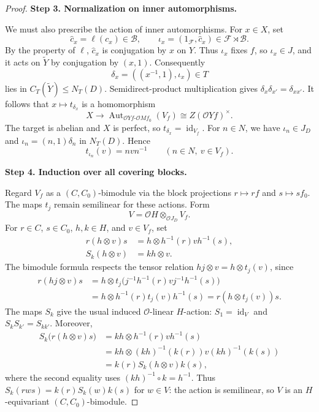 \documentclass[11pt,a4paper]{article}
\theoremstyle{definition}
\theoremstyle{remark}
\numberwithin{equation}{section}
\newcommand{\cO}{\mathcal{O}}
\DeclareMathOperator{\Aut}{Aut}
\DeclareMathOperator{\id}{id}
\newcommand{\proofstep}[1]{%
	\par\addvspace{\medskipamount}%
	\noindent\textbf{#1}\par\nobreak
	\smallskip\nobreak\noindent\ignorespaces
}
\begin{document}
\begin{proof}
		\proofstep{Step 3. Normalization on inner automorphisms.}
		We must also prescribe the action of inner automorphisms.
		For $x\in X$, set
		\[
		\widehat c_x=\ell(c_x)\in\mathcal B,\qquad
		\iota_x=(1_{\mathcal F},\widehat c_x)\in\mathcal F\rtimes\mathcal B.
		\]
		By the property of $\ell$, $\widehat c_x$ is conjugation by $x$
		on $Y$. Thus $\iota_x$ fixes $f$, so $\iota_x\in J$, and it acts
		on $\widetilde Y$ by conjugation by $(x,1)$.
		Consequently
		\[
		\delta_x=((x^{-1},1),\iota_x)\in T
		\]
		lies in $C_T(\widetilde Y)\leq N_T(D)$.
		Semidirect-product multiplication gives
		$\delta_x\delta_{x'}=\delta_{xx'}$.
		It follows that $x\mapsto t_{\delta_x}$ is a homomorphism
		\[
		X\longrightarrow
		\Aut_{\cO Yf\text{-}\cO Mf_0}(V_f)
		\cong Z(\cO Yf)^\times.
		\]
		The target is abelian and $X$ is perfect, so $t_{\delta_x}=\id_{V_f}$.
		For $n\in N$, we have $\iota_n\in J_D$ and
		$\iota_n=(n,1)\delta_n$ in $N_T(D)$. Hence
		\begin{equation}\label{eq:local-cover-inner}
			t_{\iota_n}(v)=nvn^{-1}\qquad(n\in N,\ v\in V_f).
		\end{equation}
		\proofstep{Step 4. Induction over all covering blocks.}
		Regard $V_f$ as a $(C,C_0)$-bimodule via the block projections
		$r\mapsto rf$ and $s\mapsto sf_0$.
		The maps $t_j$ remain semilinear for these actions.
		Form
		\[
		V=\cO H\otimes_{\cO J_D}V_f.
		\]
		For $r\in C$, $s\in C_0$, $h,k\in H$, and $v\in V_f$, set
		\[
		\begin{aligned}
			r(h\otimes v)s&=h\otimes h^{-1}(r)v h^{-1}(s),\\
			S_k(h\otimes v)&=kh\otimes v.
		\end{aligned}
		\]
		The bimodule formula respects the tensor relation
		$hj\otimes v=h\otimes t_j(v)$, since
		\[
		\begin{aligned}
			r(hj\otimes v)s
			&=h\otimes t_j\bigl(j^{-1}h^{-1}(r)v j^{-1}h^{-1}(s)\bigr)\\
			&=h\otimes h^{-1}(r)t_j(v)h^{-1}(s)
			=r(h\otimes t_j(v))s.
		\end{aligned}
		\]
		The maps $S_k$ give the usual induced $\cO$-linear $H$-action:
		$S_1=\id_V$ and $S_kS_{k'}=S_{kk'}$.
		Moreover,
		\[
		\begin{aligned}
			S_k\bigl(r(h\otimes v)s\bigr)
			&=kh\otimes h^{-1}(r)v h^{-1}(s)\\
			&=kh\otimes (kh)^{-1}(k(r))v (kh)^{-1}(k(s))\\
			&=k(r)S_k(h\otimes v)k(s),
		\end{aligned}
		\]
		where the second equality uses $(kh)^{-1}\circ k=h^{-1}$.
		Thus $S_k(rws)=k(r)S_k(w)k(s)$ for $w\in V$:
		the action is semilinear, so $V$ is an $H$-equivariant
		$(C,C_0)$-bimodule.
		

\end{proof}
\end{document}
